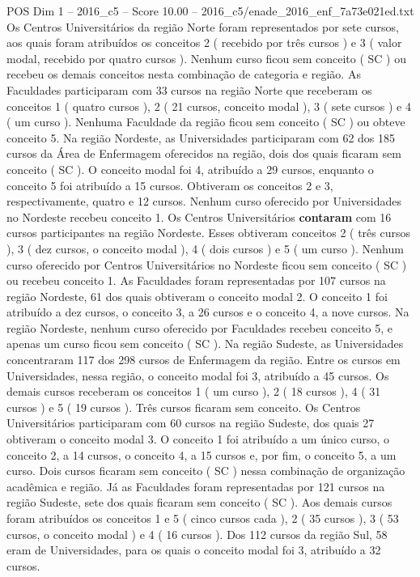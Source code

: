 \begin{textsample}{POS Dim 1 – 2016\_c5 – Score 10.00 – 2016\_c5/enade\_2016\_enf\_7a73e021ed.txt}
Os Centros Universitários da região Norte foram representados por sete cursos, aos quais foram atribuídos os conceitos 2 ( recebido por três cursos ) e 3 ( valor modal, recebido por quatro cursos ).
Nenhum curso ficou sem conceito ( SC ) ou recebeu os demais conceitos nesta combinação de categoria e região.
As Faculdades participaram com 33 cursos na região Norte que receberam os conceitos 1 ( quatro cursos ), 2 ( 21 cursos, conceito modal ), 3 ( sete cursos ) e 4 ( um curso ).
Nenhuma Faculdade da região ficou sem conceito ( SC ) ou obteve conceito 5.
Na região Nordeste, as Universidades participaram com 62 dos 185 cursos da Área de Enfermagem oferecidos na região, dois dos quais ficaram sem conceito ( SC ).
O conceito modal foi 4, atribuído a 29 cursos, enquanto o conceito 5 foi atribuído a 15 cursos.
Obtiveram os conceitos 2 e 3, respectivamente, quatro e 12 cursos.
Nenhum curso oferecido por Universidades no Nordeste recebeu conceito 1.
Os Centros Universitários \textbf{contaram} com 16 cursos participantes na região Nordeste.
Esses obtiveram conceitos 2 ( três cursos ), 3 ( dez cursos, o conceito modal ), 4 ( dois cursos ) e 5 ( um curso ).
Nenhum curso oferecido por Centros Universitários no Nordeste ficou sem conceito ( SC ) ou recebeu conceito 1.
As Faculdades foram representadas por 107 cursos na região Nordeste, 61 dos quais obtiveram o conceito modal 2.
O conceito 1 foi atribuído a dez cursos, o conceito 3, a 26 cursos e o conceito 4, a nove cursos.
Na região Nordeste, nenhum curso oferecido por Faculdades recebeu conceito 5, e apenas um curso ficou sem conceito ( SC ).
Na região Sudeste, as Universidades concentraram 117 dos 298 cursos de Enfermagem da região.
Entre os cursos em Universidades, nessa região, o conceito modal foi 3, atribuído a 45 cursos.
Os demais cursos receberam os conceitos 1 ( um curso ), 2 ( 18 cursos ), 4 ( 31 cursos ) e 5 ( 19 cursos ).
Três cursos ficaram sem conceito.
Os Centros Universitários participaram com 60 cursos na região Sudeste, dos quais 27 obtiveram o conceito modal 3.
O conceito 1 foi atribuído a um único curso, o conceito 2, a 14 cursos, o conceito 4, a 15 cursos e, por fim, o conceito 5, a um curso.
Dois cursos ficaram sem conceito ( SC ) nessa combinação de organização acadêmica e região.
Já as Faculdades foram representadas por 121 cursos na região Sudeste, sete dos quais ficaram sem conceito ( SC ).
Aos demais cursos foram atribuídos os conceitos 1 e 5 ( cinco cursos cada ), 2 ( 35 cursos ), 3 ( 53 cursos, o conceito modal ) e 4 ( 16 cursos ).
Dos 112 cursos da região Sul, 58 eram de Universidades, para os quais o conceito modal foi 3, atribuído a 32 cursos.

\end{textsample}
